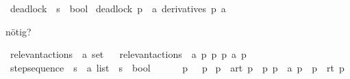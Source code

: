 \begin{isabellebody}
\ deadlock\ {\isacharcolon}{\kern0pt}{\isacharcolon}{\kern0pt}\ {\isacartoucheopen}{\isacharprime}{\kern0pt}s\ {\isasymRightarrow}\ bool{\isacartoucheclose}\ \isanewline
{\isacartoucheopen}deadlock\ p\ {\isasymequiv}\ {\isacharparenleft}{\kern0pt}{\isasymforall}a{\isachardot}{\kern0pt}\ derivatives\ p\ a\ {\isacharequal}{\kern0pt}\ {\isacharbraceleft}{\kern0pt}{\isacharbraceright}{\kern0pt}{\isacharparenright}{\kern0pt}{\isacartoucheclose}%
\begin{isamarkuptext}%
nötig?%
\end{isamarkuptext}\isamarkuptrue%
\isamarkupfalse%
\ relevant{\isacharunderscore}{\kern0pt}actions\ {\isacharcolon}{\kern0pt}{\isacharcolon}{\kern0pt}\ {\isacartoucheopen}{\isacharprime}{\kern0pt}a\ set{\isacartoucheclose}\isanewline
\ \ \isanewline
{\isacartoucheopen}relevant{\isacharunderscore}{\kern0pt}actions\ {\isasymequiv}\ {\isacharbraceleft}{\kern0pt}a{\isachardot}{\kern0pt}\ {\isasymexists}p\ p{\isacharprime}{\kern0pt}{\isachardot}{\kern0pt}\ p\ {\isasymmapsto}a\ p{\isacharprime}{\kern0pt}{\isacharbraceright}{\kern0pt}{\isacartoucheclose}\isanewline
\isanewline
{}\isamarkupfalse%
\ step{\isacharunderscore}{\kern0pt}sequence\ {\isacharcolon}{\kern0pt}{\isacharcolon}{\kern0pt}\ {\isacartoucheopen}{\isacharprime}{\kern0pt}s\ {\isasymRightarrow}\ {\isacharprime}{\kern0pt}a\ list\ {\isasymRightarrow}\ {\isacharprime}{\kern0pt}s\ {\isasymRightarrow}\ bool{\isacartoucheclose}\ {\isacharparenleft}{\kern0pt}{\isacartoucheopen}{\isacharunderscore}{\kern0pt}\ {\isasymmapsto}{\isachardollar}{\kern0pt}\ {\isacharunderscore}{\kern0pt}\ {\isacharunderscore}{\kern0pt}{\isacartoucheclose}{\isacharbrackleft}{\kern0pt}{}{}{\isacharcomma}{\kern0pt}{}{}{\isacharcomma}{\kern0pt}{}{}{\isacharbrackright}{\kern0pt}\ {}{}{\isacharparenright}{\kern0pt}\ \isanewline
{\isacartoucheopen}p\ {\isasymmapsto}{\isachardollar}{\kern0pt}\ {\isacharbrackleft}{\kern0pt}{\isacharbrackright}{\kern0pt}\ p{\isacartoucheclose}\ {\isacharbar}{\kern0pt}\isanewline
{\isacartoucheopen}p\ {\isasymmapsto}{\isachardollar}{\kern0pt}\ {\isacharparenleft}{\kern0pt}a{\isacharhash}{\kern0pt}rt{\isacharparenright}{\kern0pt}\ p{\isacharprime}{\kern0pt}{\isacharprime}{\kern0pt}{\isacartoucheclose}\ \ {\isacartoucheopen}{\isasymexists}p{\isacharprime}{\kern0pt}{\isachardot}{\kern0pt}\ p\ {\isasymmapsto}\ a\ p{\isacharprime}{\kern0pt}\ {\isasymand}\ p{\isacharprime}{\kern0pt}\ {\isasymmapsto}{\isachardollar}{\kern0pt}\ rt\ p{\isacharprime}{\kern0pt}{\isacharprime}{\kern0pt}{\isacartoucheclose}\isanewline
\isanewline
{}\isamarkupfalse%
\isanewline
%
\isadelimtheory
%
\endisadelimtheory
%
\isatagtheory
%
\endisatagtheory
{\isafoldtheory}%
%
\isadelimtheory
%
\endisadelimtheory
%
\end{isabellebody}%
